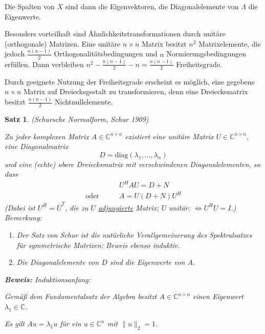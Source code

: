 \documentclass[%
a4paper,
11pt,		%
leqno,		%
]
{scrartcl}
\theoremstyle{plain}
\theoremstyle{plain}
\newtheorem{mysatz}[mydef]{Satz}
\theoremstyle{plain}
\theoremstyle{plain}
\begin{document}
Die Spalten von $X$ sind dann die Eigenvektoren, die Diagonalelemente von $\Lambda$ die Eigenwerte.

Besonders vorteilhaft sind Ähnlichkeitstransformationen durch unitäre (orthogonale) Matrizen. Eine unitäre $n \times n$ Matrix besitzt $n^2$ Matrixelemente, die jedoch $\frac{n(n-1)}{2}$ Orthogonalitätsbedingungen und $n$ Normierungsbedingungen erfüllen.
Dann verbleiben $n^2 - \frac{n(n-1)}{2} -n = \frac{n(n-1)}{2}$ Freiheitsgrade. 

Durch geeignete Nutzung der Freiheitsgrade erscheint es möglich, eine gegebene $n \times n$ Matrix auf Dreiecksgestalt zu transformieren, denn eine Dreiecksmatrix besitzt $\frac{n(n-1)}{2}$ Nichtnullelemente.  

\begin{mysatz}
(Schursche Normalform, Schur 1909)

Zu jeder komplexen Matrix $A \in \mathbb{C}^{n \times n}$ existiert eine unitäre Matrix $U \in \mathbb{C}^{n \times n}$, eine Diagonalmatrix 
\[
D = \text{diag}(\lambda_1, \ldots, \lambda_n)
\]
und eine (echte) obere Dreiecksmatrix mit verschwindenen Diagonalelementen, so dass 
\begin{align*}
 & U^H A U = D + N \\
 \text{oder} \qquad & A = U(D+N)U^H
\end{align*}
(Dabei ist $U^H = \overline{U}^T$, die zu $U$ \uline{adjungierte} Matrix; $U$ unitär: $\Leftrightarrow U^HU = I$.)\\

\textit{Bemerkung:}
\begin{enumerate}
    \item Der Satz von Schur ist die natürliche Verallgemeinerung des Spektralsatzes für symmetrische Matrizen; Beweis ebenso induktiv.
    \item Die Diagonalelemente von $D$ sind die Eigenwerte von $A$.
\end{enumerate}
\textbf{Beweis:} Induktionsanfang:

Gemäß dem Fundamentalsatz der Algebra besitzt $A \in \mathbb{C}^{n \times n}$ einen Eigenwert $\lambda_1 \in \mathbb{C}$.

Es gilt $Au = \lambda_1 u$ für ein $u \in \mathbb{C}^n$ mit $\| u \|_2 = 1$.


\end{mysatz}
\end{document}
